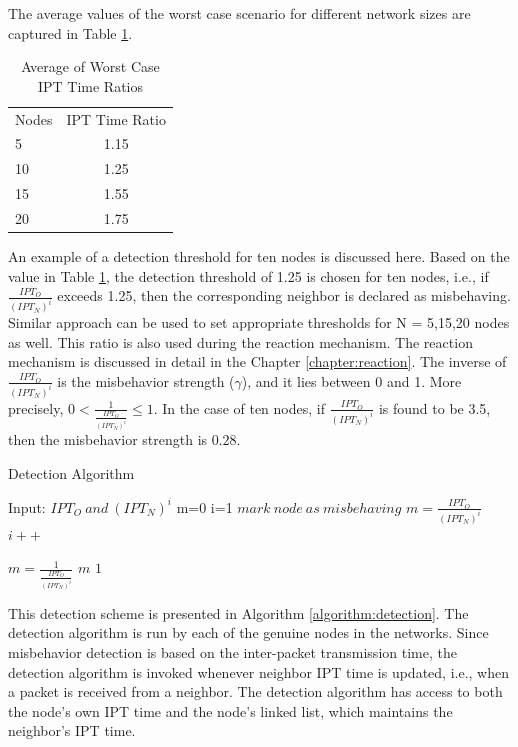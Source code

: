 \documentclass[12pt,letterpaper,english]{article}
\begin{document}
\indent The average values of the worst case scenario for different network sizes are captured in Table \ref{table:averageworstcase}. 
\begin{table}[H]
\caption{Average of Worst Case IPT Time Ratios}
\label{table:averageworstcase}
\begin{center}
\begin{tabular}{l c}
\hline
\hline
Nodes & IPT Time Ratio\\
5 & 1.15\\
10 & 1.25\\
15 & 1.55\\
20 & 1.75\\
\hline
\end{tabular}
\end{center}
\end{table}
An example of a detection threshold for ten nodes is discussed here.
Based on the value in Table \ref{table:averageworstcase}, the detection threshold of 1.25 is chosen for ten nodes, i.e., if $\frac{IPT_O}{(IPT_N)^i}$ exceeds 1.25, then the corresponding neighbor is declared as misbehaving. Similar approach can be used to set appropriate thresholds for N = {5,15,20} nodes as well. This ratio is also used during the reaction mechanism. The reaction mechanism is discussed in detail in the Chapter \ref{chapter:reaction}.
\indent The inverse of $\frac{IPT_O}{(IPT_N)^i}$ is the misbehavior strength ($\gamma$), and it lies between 0 and 1. More precisely, $0 < \frac{1}{\frac{IPT_O}{(IPT_N)^i}} \leq 1$. In the case of ten nodes, if $\frac{IPT_O}{(IPT_N)^i}$ is found to be 3.5, then the misbehavior strength is $0.28$.
\begin{algorithm}
\caption{Detection Algorithm}
\label{algorithm:detection}
\begin{algorithmic}
\STATE Input: $IPT_O\ and\ (IPT_N)^i$
\STATE m=0
\STATE i=1
        \STATE $mark\ node\ as\ misbehaving$
        	\STATE $m = \frac{IPT_O}{(IPT_N)^i}$
        \ENDIF
	\ENDIF
	\STATE $i++$
\ENDWHILE

	\STATE $m = \frac{1}{\frac{IPT_O}{(IPT_N)^i}}$
	\RETURN $m$
\ELSE
	\RETURN $1$
\ENDIF
\end{algorithmic}
\end{algorithm}
This detection scheme is presented in Algorithm \ref{algorithm:detection}. The detection algorithm is run by each of the genuine nodes in the networks. Since misbehavior detection is based on the inter-packet transmission time, the detection algorithm is invoked whenever neighbor IPT time is updated, i.e., when a packet is received from a neighbor. The detection algorithm has access to both the node's own IPT time and the node's linked list, which maintains the neighbor's IPT time.
\end{document}
